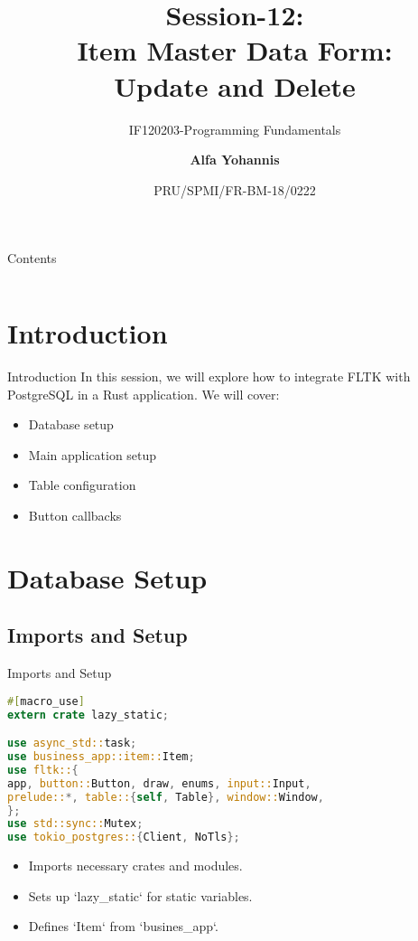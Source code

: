 \documentclass[aspectratio=169, table]{beamer}
\subtitle{IF120203-Programming Fundamentals}
\title{Session-12:\\\LARGE{Item Master Data Form:\\Update and Delete}}
\date[Serial]{\scriptsize {PRU/SPMI/FR-BM-18/0222}}
\author[Pradita]{\small{\textbf{Alfa Yohannis}}}
\begin{document}
\frame{\titlepage}

\begin{frame}{Contents}
\vspace{15pt}
\begin{columns}[t]
\begin{column}{.5\textwidth}
\tableofcontents[sections={1-3}]
\end{column}
\begin{column}{.5\textwidth}
\tableofcontents[sections={4-6}]
\end{column}
\end{columns}
\end{frame}


\section{Introduction}
\begin{frame}{Introduction}
In this session, we will explore how to integrate FLTK with PostgreSQL in a Rust application. We will cover:
\begin{itemize}
\item Database setup
\item Main application setup
\item Table configuration
\item Button callbacks
\end{itemize}
\end{frame}

\section{Database Setup}
\subsection{Imports and Setup}
\begin{frame}[fragile]{Imports and Setup}
\vspace{15pt}
\begin{lstlisting}[language=Rust]
#[macro_use]
extern crate lazy_static;

use async_std::task;
use business_app::item::Item;
use fltk::{
app, button::Button, draw, enums, input::Input,
prelude::*, table::{self, Table}, window::Window,
};
use std::sync::Mutex;
use tokio_postgres::{Client, NoTls};
\end{lstlisting}

\begin{itemize}
\item Imports necessary crates and modules.
\item Sets up `lazy\_static` for static variables.
\item Defines `Item` from `busines\_app`.
\end{itemize}
\end{frame}
\end{document}
